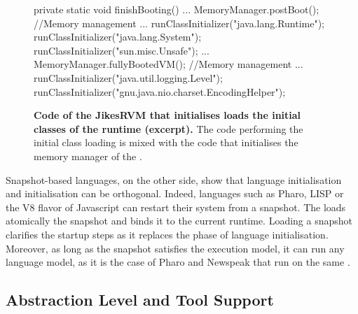 \begin{figure}[ht]
\begin{code}
private static void finishBooting() {
    ...
    MemoryManager.postBoot(); //Memory management
    ...
    runClassInitializer("java.lang.Runtime");
    runClassInitializer("java.lang.System");
    runClassInitializer("sun.misc.Unsafe");
    ...
    MemoryManager.fullyBootedVM(); //Memory management
    ...
    runClassInitializer("java.util.logging.Level");
    runClassInitializer("gnu.java.nio.charset.EncodingHelper");
}
\end{code}
\caption{\textbf{Code of the JikesRVM that initialises loads the initial classes of the runtime (excerpt).} The code performing the initial class loading is mixed with the code that initialises the memory manager of the \VM.\label{code:jikes_vm_initialisation}}
\end{figure}

Snapshot-based languages, on the other side, show that language initialisation and \VM initialisation can be orthogonal. Indeed, languages such as Pharo, LISP or the V8 flavor of Javascript can restart their system from a snapshot. The \VM loads atomically the snapshot and binds it to the current runtime. Loading a snapshot clarifies the \VM startup steps as it replaces the phase of language initialisation. Moreover, as long as the snapshot satisfies the \VM execution model, it can run any language model, as it is the case of Pharo and Newspeak that run on the same \VM.



\subsection{Abstraction Level and Tool Support}

